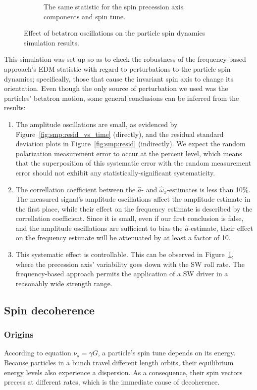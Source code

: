 \documentclass[]{elsarticle}
\newcommand{\w}{\omega}
\begin{document}
\begin{figure}[h]
\begin{subfigure}{\linewidth}
    \caption{The same statistic for the spin precession axis components and spin tune.\label{fig:smp:NBAR}}
  \end{subfigure}
  \caption{Effect of betatron oscillations on the particle spin dynamics simulation results.\label{fig:smp}}
\end{figure}

This simulation was set up so as to check the robustness of the frequency-based approach's EDM statistic
with regard to perturbations to the particle spin dynamics; specifically, those that cause the invariant
spin axis to change its orientation. Even though the only source of perturbation we used was
the particles' betatron motion, some general conclusions can be inferred from the results:
\begin{enumerate}[(1)]
\item The amplitude oscillations are small, as evidenced by Figure~\ref{fig:smp:resid_vs_time} (directly),
  and the residual standard deviation plots in Figure~\ref{fig:smp:resid} (indirectly). We expect the
  random polarization measurement error to occur at the percent level, which means that the superposition
  of this systematic error with the random measurement error should not exhibit any
  statistically-significant systematicity.
\item The correllation coefficient between the $\hat a$- and $\hat\w_x$-estimates is less than 10\%.
  The measured signal's amplitude oscillations affect the amplitude estimate in the first place, while
  their effect on the frequency estimate is described by the correllation coefficient. Since it is small,
  even if our first conclusion is false, and the amplitude oscillations are sufficient to bias the
  $\hat a$-estimate, their effect on the frequency estimate will be attenuated by at least a factor of 10.
\item This systematic effect is controllable. This can be observed in Figure~\ref{fig:smp:NBAR}, where
  the precession axis' variability goes down with the SW roll rate. The frequency-based approach permits
  the application of a SW driver in a reasonably wide strength range.
\end{enumerate}

\subsection{Spin decoherence}
\subsubsection{Origins}
According to equation $\nu_s = \gamma G$, a particle's spin tune depends on its energy. Because particles in
a bunch travel different length orbits, their equilibrium energy levels also experience a dispersion. As a
consequence, their spin vectors precess at different rates,
which is the immediate cause of decoherence.~\cite{Senichev:IPAC13}
\end{document}
